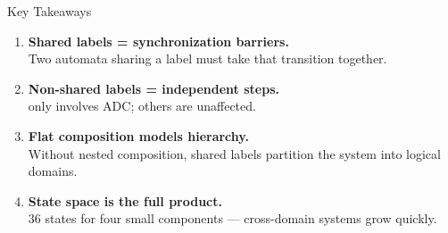\begin{frame}{Key Takeaways}

\begin{enumerate}
  \item \textbf{Shared labels = synchronization barriers.} \\
        Two automata sharing a label must take that transition together.
  \item \textbf{Non-shared labels = independent steps.} \\
         only involves ADC; others are unaffected.
  \item \textbf{Flat composition models hierarchy.} \\
        Without nested composition, shared labels partition the system
        into logical domains.
  \item \textbf{State space is the full product.} \\
        $36$ states for four small components --- cross-domain systems
        grow quickly.
\end{enumerate}

\end{frame}


